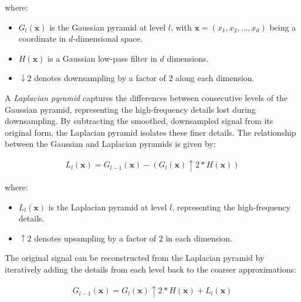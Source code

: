 where:
\begin{itemize}
  \item \(G_l(\mathbf{x})\) is the Gaussian pyramid at level \(l\), with \(\mathbf{x} = (x_1, x_2, \dots, x_d)\) being a coordinate in \(d\)-dimensional space.
  \item \(H(\mathbf{x})\) is a Gaussian low-pass filter in \(d\) dimensions.
  \item \(\downarrow 2\) denotes downsampling by a factor of 2 along each dimension.
\end{itemize}
 
A \textit{Laplacian pyramid} captures the differences between consecutive levels of the Gaussian pyramid, representing the high-frequency details lost during downsampling. By subtracting the smoothed, downsampled signal from its original form, the Laplacian pyramid isolates these finer details. The relationship between the Gaussian and Laplacian pyramids is given by:

\begin{align}
  L_l(\mathbf{x}) = G_{l-1}(\mathbf{x}) - (G_l(\mathbf{x}) \uparrow 2 * H(\mathbf{x}))
\end{align}


where:
\begin{itemize}
  \item \(L_l(\mathbf{x})\) is the Laplacian pyramid at level \(l\), representing the high-frequency details.
  \item \(\uparrow 2\) denotes upsampling by a factor of 2 in each dimension.
\end{itemize} 

The original signal can be reconstructed from the Laplacian pyramid by iteratively adding the details from each level back to the coarser approximations:

\begin{align}
  G_{l-1}(\mathbf{x}) = G_l(\mathbf{x}) \uparrow 2 * H(\mathbf{x}) + L_l(\mathbf{x})
\end{align}

